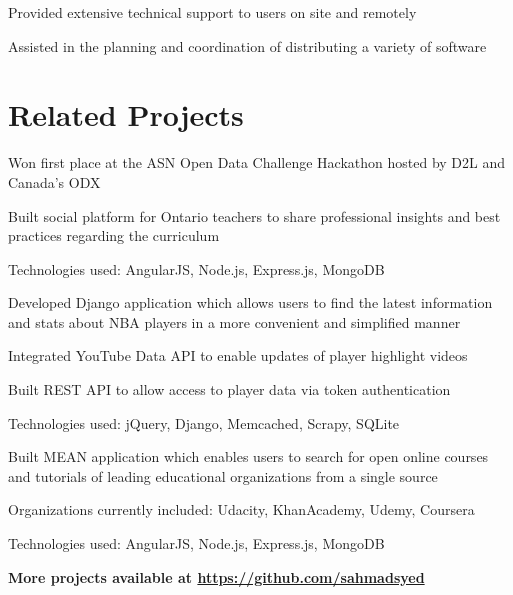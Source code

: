 \documentclass[letterpaper]{deedy-resume}
\begin{document}
\begin{minipage}[t]{0.66\textwidth}
\sectionspace


\begin{tightitemize}
\item Provided extensive technical support to users on site and remotely
\item Assisted in the planning and coordination of distributing a variety of software
\end{tightitemize}

\sectionspace

\section{Related Projects}

\location{}
\begin{tightitemize}
\item Won first place at the ASN Open Data Challenge Hackathon hosted by D2L and Canada's ODX
\item Built social platform for Ontario teachers to share professional insights and best practices regarding the curriculum
\item Technologies used: AngularJS, Node.js, Express.js, MongoDB
\end{tightitemize}
\sectionspace

\location{}
\begin{tightitemize}
\item Developed Django application which allows users to find the latest information and stats about NBA players in a more convenient and simplified manner
\item Integrated YouTube Data API to enable updates of player highlight videos
\item Built REST API to allow access to player data via token authentication
\item Technologies used: jQuery, Django, Memcached, Scrapy, SQLite
\end{tightitemize}
\sectionspace

\location{}
\begin{tightitemize}
\item Built MEAN application which enables users to search for open online courses and tutorials of leading educational organizations from a single source
\item Organizations currently included: Udacity, KhanAcademy, Udemy, Coursera
\item Technologies used: AngularJS, Node.js, Express.js, MongoDB
\end{tightitemize}
\sectionspace

\textbf{More projects available at \href{https://github.com/sahmadsyed}{https://github.com/sahmadsyed}}

\end{minipage} %
\end{document}
